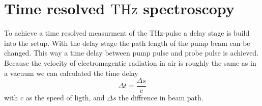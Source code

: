 \section{Time resolved $\si{\tera\hertz}$ spectroscopy}
To achieve a time resolved measurment of the $\si{\tera\hertz}$-pulse a delay stage is build into the setup.
With the delay stage the path length of the pump beam can be changed.
This way a time delay between pump pulse and probe pulse is achieved.
Because the velocity of electromagentic radiation in air is roughly the same as in a vacuum we can calculated the time delay   
\begin{equation}
    \Delta t = \frac{\Delta s}{c}
\end{equation}
with $c$ as the speed of ligth, and $\Delta s$ the diffrence in beam path.
